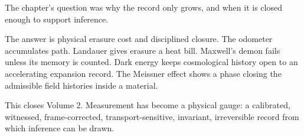 \begin{bridge}

The chapter's question was why the record only grows, and when it is closed
enough to support inference.

The answer is physical erasure cost and disciplined closure. The odometer
accumulates path. Landauer gives erasure a heat bill. Maxwell's demon fails
unless its memory is counted. Dark energy keeps cosmological history open to an
accelerating expansion record. The Meissner effect shows a phase closing the
admissible field histories inside a material.

This closes Volume 2. Measurement has become a physical gauge: a calibrated,
witnessed, frame-corrected, transport-sensitive, invariant, irreversible record
from which inference can be drawn.

\end{bridge}

